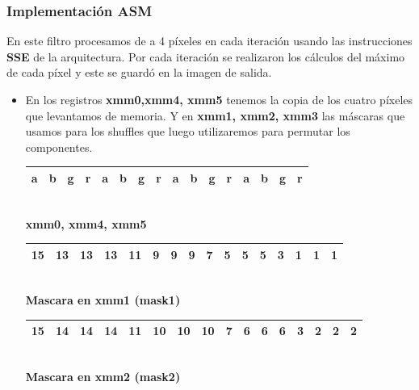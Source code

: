 \subsubsection{Implementación ASM}

En este filtro procesamos de a 4 píxeles en cada iteración usando las instrucciones \textbf{SSE} de la arquitectura. Por cada iteración se realizaron los cálculos del máximo de cada píxel y este se guardó en la imagen de salida.

\begin{itemize}

	\item En los registros \textbf{xmm0,xmm4, xmm5} tenemos la copia de los cuatro píxeles que levantamos de memoria. Y en \textbf{xmm1, xmm2, xmm3} las máscaras que usamos para los shuffles que luego utilizaremos para permutar los componentes.

		\begin{center}
		   \begin{tabular}{| c | c | c | c || c | c | c | c || c | c | c | c || c | c | c | c |}
			 \hline
			 a & b & g & r & a & b & g & r & a & b & g & r & a & b & g & r \\ \hline

		   \end{tabular}
		   \\ \textbf{xmm0, xmm4, xmm5}
		\end{center}
		 
		\begin{center}
		   \begin{tabular}{| c | c | c | c || c | c | c | c || c | c | c | c || c | c | c | c |}
			 \hline
			 15 & 13 & 13 & 13 & 11 & 9 & 9 & 9 & 7 & 5 & 5 & 5 & 3 & 1 & 1 & 1 \\ \hline
		   \end{tabular}
		   \\  \textbf{Mascara en xmm1 (mask1)}
		\end{center}

		\begin{center}
		   \begin{tabular}{| c | c | c | c || c | c | c | c || c | c | c | c || c | c | c | c |}
			 \hline
			 15 & 14 & 14 & 14 & 11 & 10 & 10 & 10 & 7 & 6 & 6 & 6 & 3 & 2 & 2 & 2 \\ \hline
		   \end{tabular}
		   \\ \textbf{Mascara en xmm2 (mask2)}
		\end{center}


\end{itemize}
